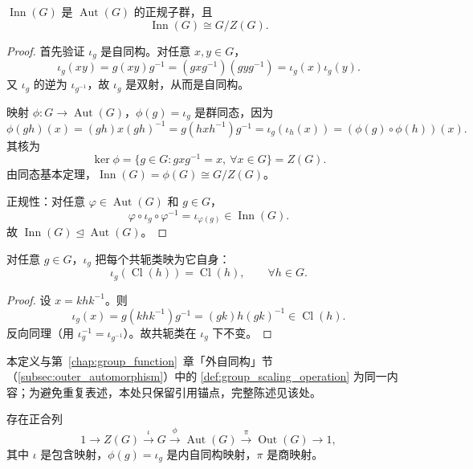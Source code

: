 \begin{proposition}[内自同构群的结构]\label{prop:inner_automorphism_group}
$\operatorname{Inn}(G)$ 是 $\operatorname{Aut}(G)$ 的正规子群，且
\[
\operatorname{Inn}(G) \cong G/Z(G).
\]
\end{proposition}

\begin{proof}
首先验证 $\iota_g$ 是自同构。对任意 $x,y\in G$，
\[
\iota_g(xy) = g(xy)g^{-1} = (gxg^{-1})(gyg^{-1}) = \iota_g(x)\iota_g(y).
\]
又 $\iota_g$ 的逆为 $\iota_{g^{-1}}$，故 $\iota_g$ 是双射，从而是自同构。

映射 $\phi: G\to\operatorname{Aut}(G)$，$\phi(g)=\iota_g$ 是群同态，因为
\[
\phi(gh)(x) = (gh)x(gh)^{-1} = g(hxh^{-1})g^{-1} = \iota_g(\iota_h(x)) = (\phi(g)\circ\phi(h))(x).
\]
其核为
\[
\ker\phi = \{g\in G : gxg^{-1}=x,\ \forall x\in G\} = Z(G).
\]
由同态基本定理，$\operatorname{Inn}(G) = \phi(G) \cong G/Z(G)$。

正规性：对任意 $\varphi\in\operatorname{Aut}(G)$ 和 $g\in G$，
\[
\varphi\circ\iota_g\circ\varphi^{-1} = \iota_{\varphi(g)} \in\operatorname{Inn}(G).
\]
故 $\operatorname{Inn}(G)\trianglelefteq\operatorname{Aut}(G)$。
\end{proof}

\begin{proposition}[内自同构保持共轭类]\label{prop:inner_preserves_conjugacy}
对任意 $g\in G$，$\iota_g$ 把每个共轭类映为它自身：
\[
\iota_g(\operatorname{Cl}(h)) = \operatorname{Cl}(h),\qquad \forall h\in G.
\]
\end{proposition}

\begin{proof}
设 $x = khk^{-1}$。则
\[
\iota_g(x) = g(khk^{-1})g^{-1} = (gk)h(gk)^{-1} \in \operatorname{Cl}(h).
\]
反向同理（用 $\iota_g^{-1}=\iota_{g^{-1}}$）。故共轭类在 $\iota_g$ 下不变。
\end{proof}

\begin{definition}[外自同构群]\label{def:higher_outer_automorphism}
本定义与第~\ref{chap:group_function}~章「外自同构」节（\cref{subsec:outer_automorphism}）中的 \cref{def:group_scaling_operation} 为同一内容；为避免重复表述，本处只保留引用锚点，完整陈述见该处。
\end{definition}

\begin{proposition}[自同构群的正合列]\label{prop:automorphism_exact_sequence}
存在正合列
\[
1 \longrightarrow Z(G) \xrightarrow{\ \iota\ } G \xrightarrow{\ \phi\ } \operatorname{Aut}(G) \xrightarrow{\ \pi\ } \operatorname{Out}(G) \longrightarrow 1,
\]
其中 $\iota$ 是包含映射，$\phi(g)=\iota_g$ 是内自同构映射，$\pi$ 是商映射。
\end{proposition}

